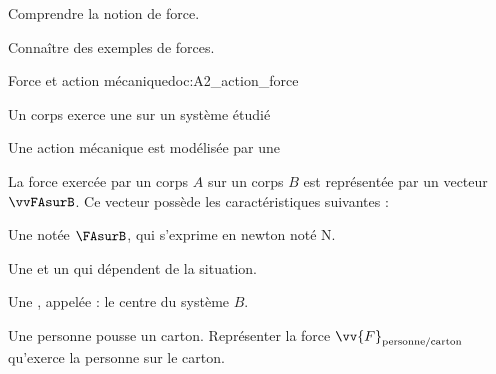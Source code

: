 \teteSndMouv

\vspace*{-32pt}

\begin{objectifs}
  \item Comprendre la notion de force.
  \item Connaître des exemples de forces.
\end{objectifs}

\begin{doc}{Force et action mécanique}{doc:A2_action_force}
  \begin{importants}  
    Un corps exerce une  sur un système étudié 
  \end{importants}
  
  Une action mécanique est modélisée par une 

  \begin{importants}
    La force exercée par un corps $A$ sur un corps $B$ est représentée par un vecteur $\vvFAsurB$.
    Ce vecteur possède les caractéristiques suivantes :
    \begin{listePoints}
      \item Une  notée $\FAsurB$, qui s'exprime en newton noté \unit{\newton}.
      \item Une  et un  qui dépendent de la situation.
      \item Une , appelée  : le centre du système $B$.
    \end{listePoints}
  \end{importants}
\end{doc}

\mesure
Une personne pousse un carton. 
Représenter la force $\vv{F}_\text{personne/carton}$ qu'exerce la personne sur le carton.

\vspace*{-8pt}
\begin{center}
\end{center}


